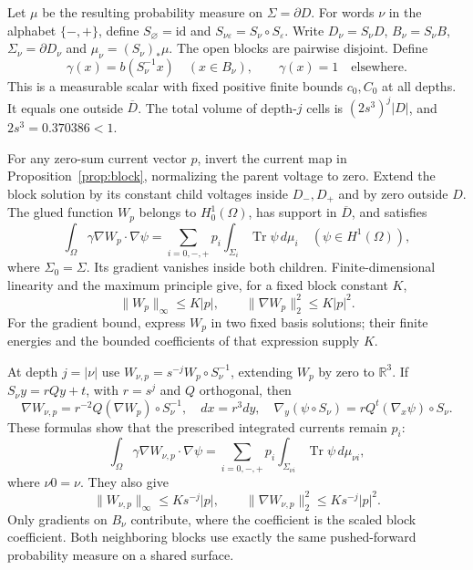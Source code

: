 \documentclass[10pt]{article}
\newcommand{\R}{\mathbb R}
\newcommand{\Tr}{\operatorname{Tr}}
\begin{document}
Let $\mu$ be the resulting probability measure on $\Sigma=\partial D$. For words $\nu$ in the alphabet $\{-,+\}$, define $S_\varnothing=\mathrm{id}$ and $S_{\nu\varepsilon}=S_\nu\circ S_\varepsilon$. Write $D_\nu=S_\nu D$, $B_\nu=S_\nu B$, $\Sigma_\nu=\partial D_\nu$ and $\mu_\nu=(S_\nu)_*\mu$. The open blocks are pairwise disjoint. Define
\begin{equation}\label{eq:gamma}
\gamma(x)=b(S_\nu^{-1}x)\quad(x\in B_\nu),\qquad \gamma(x)=1\quad\text{elsewhere}.
\end{equation}
This is a measurable scalar with fixed positive finite bounds $c_0,C_0$ at all depths. It equals one outside $\overline D$. The total volume of depth-$j$ cells is $(2s^3)^j|D|$, and $2s^3=0.370386<1$.

For any zero-sum current vector $p$, invert the current map in Proposition~\ref{prop:block}, normalizing the parent voltage to zero. Extend the block solution by its constant child voltages inside $D_-,D_+$ and by zero outside $D$. The glued function $W_p$ belongs to $H^1_0(\Omega)$, has support in $\overline D$, and satisfies
\begin{equation}\label{eq:rootcharges}
\int_\Omega\gamma\nabla W_p\cdot\nabla\psi
=\sum_{i=0,-,+}p_i\int_{\Sigma_i}\Tr\psi\,d\mu_i
\quad(\psi\in H^1(\Omega)),
\end{equation}
where $\Sigma_0=\Sigma$. Its gradient vanishes inside both children. Finite-dimensional linearity and the maximum principle give, for a fixed block constant $K$,
\[
\|W_p\|_\infty\leq K|p|,\qquad \|\nabla W_p\|_2^2\leq K|p|^2.
\]
For the gradient bound, express $W_p$ in two fixed basis solutions; their finite energies and the bounded coefficients of that expression supply $K$.

At depth $j=|\nu|$ use $W_{\nu,p}=s^{-j}W_p\circ S_\nu^{-1}$, extending $W_p$ by zero to $\R^3$. If $S_\nu y=rQy+t$, with $r=s^j$ and $Q$ orthogonal, then
\[
\nabla W_{\nu,p}=r^{-2}Q(\nabla W_p)\circ S_\nu^{-1},\quad
 dx=r^3dy,\quad
\nabla_y(\psi\circ S_\nu)=rQ^t(\nabla_x\psi)\circ S_\nu.
\]
These formulas show that the prescribed integrated currents remain $p_i$:
\begin{equation}\label{eq:scaledcharges}
\int_\Omega\gamma\nabla W_{\nu,p}\cdot\nabla\psi
=\sum_{i=0,-,+}p_i\int_{\Sigma_{\nu i}}\Tr\psi\,d\mu_{\nu i},
\end{equation}
where $\nu0=\nu$. They also give
\begin{equation}\label{eq:scaledbounds}
\|W_{\nu,p}\|_\infty\leq K s^{-j}|p|,\qquad
\|\nabla W_{\nu,p}\|_2^2\leq K s^{-j}|p|^2.
\end{equation}
Only gradients on $B_\nu$ contribute, where the coefficient is the scaled block coefficient. Both neighboring blocks use exactly the same pushed-forward probability measure on a shared surface.
\end{document}
